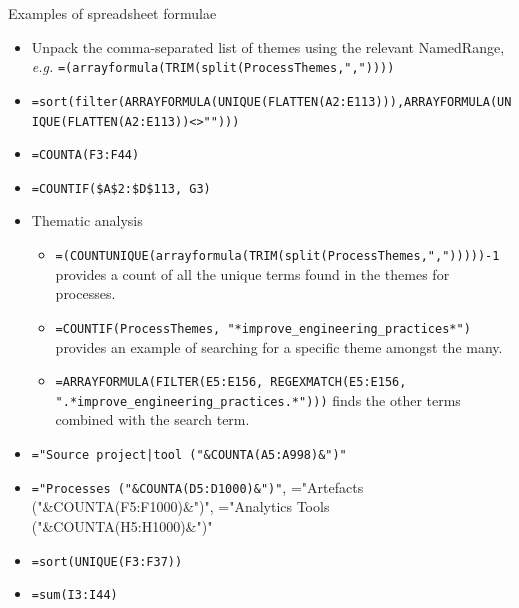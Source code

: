 Examples of spreadsheet formulae
{
\footnotesize
\begin{itemize}
    \item Unpack the comma-separated list of themes using the relevant NamedRange, \emph{e.g.} \texttt{=(arrayformula(TRIM(split(ProcessThemes,","))))}
    \item \texttt{=sort(filter(ARRAYFORMULA(UNIQUE(FLATTEN(A2:E113))),ARRAYFORMULA(UNIQUE(FLATTEN(A2:E113))<>"")))}
    \item \texttt{=COUNTA(F3:F44)}
    \item \texttt{=COUNTIF(\$A\$2:\$D\$113, G3)}
    \item Thematic analysis
    \begin{itemize}
        \item \texttt{=(COUNTUNIQUE(arrayformula(TRIM(split(ProcessThemes,",")))))-1} provides a count of all the unique terms found in the themes for processes.
        \item \texttt{=COUNTIF(ProcessThemes, "*improve\_engineering\_practices*")} provides an example of searching for a specific theme amongst the many.
        \item \texttt{=ARRAYFORMULA(FILTER(E5:E156, REGEXMATCH(E5:E156, ".*improve\_engineering\_practices.*")))} finds the other terms combined with the search term.
    \end{itemize}
    
    \item \texttt{="Source project|tool ("\&COUNTA(A5:A998)\&")"}
    
    \item \texttt{="Processes ("\&COUNTA(D5:D1000)\&")"}, ="Artefacts ("\&COUNTA(F5:F1000)\&")", ="Analytics Tools ("\&COUNTA(H5:H1000)\&")"
    \item \texttt{=sort(UNIQUE(F3:F37))}
    \item \texttt{=sum(I3:I44)}
\end{itemize}
}
